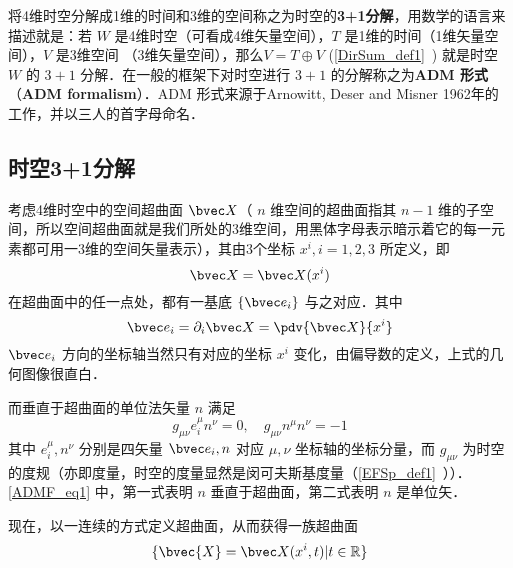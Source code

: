
\begin{issues}
\issueTODO
\end{issues}

将4维时空分解成1维的时间和3维的空间称之为时空的\textbf{3+1分解}，用数学的语言来描述就是：若 $W$ 是4维时空（可看成4维矢量空间），$T$ 是1维的时间（1维矢量空间），$V$ 是3维空间 （3维矢量空间），那么$V=T\oplus V$ (\autoref{DirSum_def1}~) 就是时空 $W$ 的 $3+1$ 分解．在一般的框架下对时空进行 $3+1$ 的分解称之为\textbf{ADM 形式}（\textbf{ADM formalism}）．ADM 形式来源于Arnowitt, Deser and Misner 1962年的工作，并以三人的首字母命名．
\subsection{时空3+1分解}
考虑4维时空中的空间超曲面 $\bvec X$（ $n$ 维空间的超曲面指其 $n-1$ 维的子空间，所以空间超曲面就是我们所处的3维空间，用黑体字母表示暗示着它的每一元素都可用一3维的空间矢量表示），其由3个坐标 $x^i,i=1,2,3$ 所定义，即 
\begin{equation}
\bvec X=\bvec X(x^i)
\end{equation}
在超曲面中的任一点处，都有一基底 $\{\bvec e_i\}$ 与之对应．其中
\begin{equation}
\bvec e_i=\partial_i \bvec X=\pdv{\bvec X}{x^i}
\end{equation}
$\bvec e_i$ 方向的坐标轴当然只有对应的坐标 $x^i$ 变化，由偏导数的定义，上式的几何图像很直白．

而垂直于超曲面的单位法矢量 $n$ 满足
\begin{equation}\label{ADMF_eq1}
g_{\mu\nu} e_i^\mu n^\nu=0,\quad g_{\mu\nu}n^\mu n^\nu=-1
\end{equation}
其中 $e_i^\mu,n^\nu$ 分别是四矢量 $\bvec e_i,n$ 对应 $\mu,\nu$ 坐标轴的坐标分量，而 $g_{\mu\nu}$ 为时空的度规（亦即度量，时空的度量显然是闵可夫斯基度量（\autoref{EFSp_def1}~））．\autoref{ADMF_eq1} 中，第一式表明 $n$ 垂直于超曲面，第二式表明 $n$ 是单位矢．

现在，以一连续的方式定义超曲面，从而获得一族超曲面 
\begin{equation}
\{\bvec{X}=\bvec X(x^i,t)|t\in\mathbb R\}
\end{equation}


